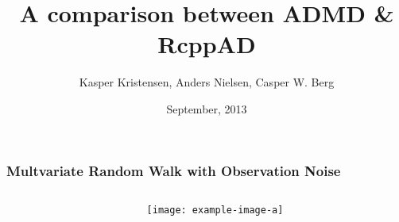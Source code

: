 \documentclass[compress]{beamer}
\title[RcppAD]
{A comparison between ADMD \& RcppAD}
\author[K. Kristensen, A. Nielsen, C.W. Berg ]%
{Kasper Kristensen, Anders Nielsen, Casper W. Berg}
\date[September 2013] %
{September, 2013}
\begin{document}
\begin{frame}[plain]
  \titlepage
\end{frame}

\begin{frame}[fragile]
  \frametitle{Multvariate Random Walk with Observation Noise}
  \begin{columns}
    \begin{column}{0.5\textwidth}
\begin{verbatim}

\end{verbatim}
    \end{column}
    \begin{column}{0.5\textwidth}
      \texttt{[image: example-image-a]}
    \end{column}
  \end{columns}
\end{frame}
\end{document}
